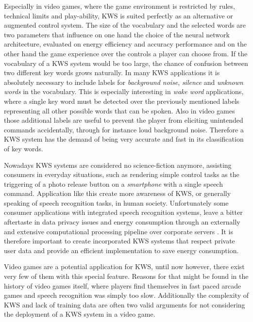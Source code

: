 Especially in video games, where the game environment is restricted by rules, technical limits and play-ability, KWS is suited perfectly as an alternative or augmented control system.
The size of the vocabulary and the selected words are two parameters that influence on one hand the choice of the neural network architecture, evaluated on energy efficiency and accuracy performance and on the other hand the game experience over the controls a player can choose from.
If the vocabulary of a KWS system would be too large, the chance of confusion between two different key words grows naturally.
In many KWS applications it is absolutely necessary to include labels for \emph{background noise}, \emph{silence} and \emph{unknown words} in the vocabulary. 
This is especially interesting in \emph{wake word} applications, where a single key word must be detected over the previously mentioned labels representing all other possible words that can be spoken.
Also in video games those additional labels are useful to prevent the player from eliciting unintended commands accidentally, through for instance loud background noise.
Therefore a KWS system has the demand of being very accurate and fast in its classification of key words.

Nowadays KWS systems are considered no science-fiction anymore, assisting consumers in everyday situations, such as rendering simple control tasks as the triggering of a photo release button on a \emph{smartphone} with a single speech command.
Application like this create more awareness of KWS, or generally speaking of speech recognition tasks, in human society.
Unfortunately some consumer applications with integrated speech recognition systems, leave a bitter aftertaste in data privacy issues and energy consumption through an externally and extensive computational processing pipeline over corporate servers \cite{Tang2018}.
It is therefore important to create incorporated KWS systems that respect private user data and provide an efficient implementation to save energy consumption.

Video games are a potential application for KWS, until now however, there exist very few of them with this special feature.
Reasons for that might be found in the history of video games itself, where players find themselves in fast paced arcade games and speech recognition was simply too slow.
Additionally the complexity of KWS and lack of training data are often two valid arguments for not considering the deployment of a KWS system in a video game.

